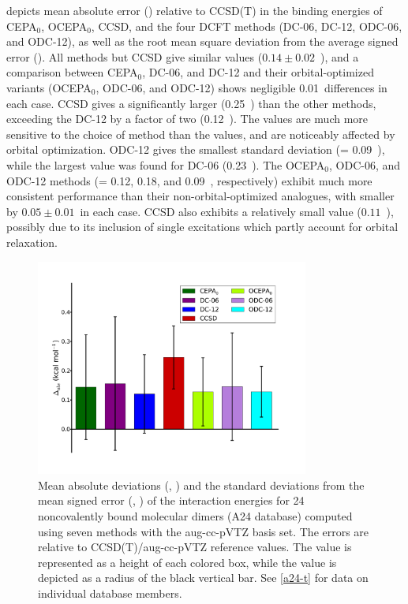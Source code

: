  depicts mean absolute error (\mae) relative to CCSD(T) in the
binding energies of CEPA$_0$, OCEPA$_0$, CCSD, and the four DCFT methods (DC-06,
DC-12, ODC-06, and ODC-12), as well as the root mean square deviation from the
average signed error (\std).
All methods but CCSD give similar \mae values ($0.14\pm 0.02$~\kcal), and a
comparison between CEPA$_0$, DC-06, and DC-12 and their orbital-optimized
variants (OCEPA$_0$, ODC-06, and ODC-12) shows negligible 0.01~\kcal differences
in each case.
CCSD gives a significantly larger \mae (0.25~\kcal) than the other methods,
exceeding the DC-12 \mae by a factor of two (0.12~\kcal).
The \std values are much more sensitive to the choice of method than the \mae
values, and are noticeably affected by orbital optimization.
ODC-12 gives the smallest standard deviation (\std = 0.09~\kcal), while the
largest \std value was found for DC-06 (0.23~\kcal). The OCEPA$_0$, ODC-06, and
ODC-12 methods (\std = 0.12, 0.18, and 0.09~\kcal, respectively) exhibit much
more consistent performance than their non-orbital-optimized analogues, with
\std smaller by $0.05\pm 0.01$~\kcal in each case.
CCSD also exhibits a relatively small \std value ($0.11$~\kcal), possibly due to
its inclusion of single excitations which partly account for orbital relaxation.

\begin{figure}[h]
	\centering
	\includegraphics[width=0.8\textwidth]{figures/a24.pdf}
	\caption{%
        \label{a24-f}
        Mean absolute deviations (\mae, \kcal) and the standard deviations from
        the mean signed error (\std, \kcal) of the interaction energies for 24
        noncovalently bound molecular dimers (A24 database) computed using seven
        methods with the aug-cc-pVTZ basis set. The errors are relative to
        CCSD(T)/aug-cc-pVTZ reference values. The \mae value is represented as a
        height of each colored box, while the \std value is depicted as a radius
        of the black vertical bar. See \cref{a24-t} for data on individual
        database members.
	}
\end{figure}

